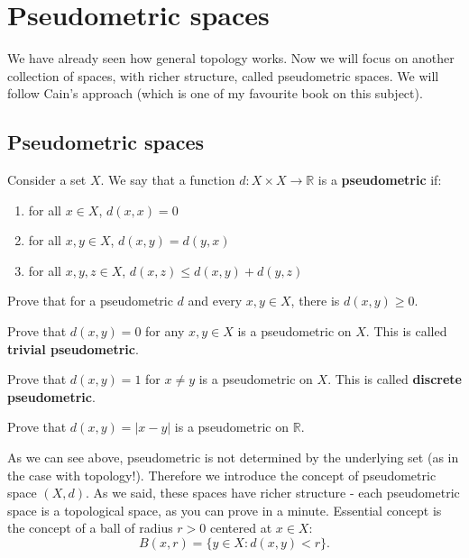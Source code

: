 \chapter{Pseudometric spaces}
\label{pseudometric_spaces}
We have already seen how general topology works. Now we will focus on another collection of spaces, with richer structure, called pseudometric spaces.
We will follow Cain's approach (which is one of my favourite book on this subject).

\section{Pseudometric spaces}
Consider a set $X$. We say that a function $d : X\times X\to \mathbb R$ is a \textbf{pseudometric} if:
\begin{enumerate}
	\item for all $x\in X$,  $d(x,x)=0$
	\item for all $x,y\in X$, $d(x,y)=d(y,x)$
	\item for all $x,y,z\in X$, $d(x,z)\le d(x,y)+d(y,z)$ 
\end{enumerate}

\begin{prob}
	Prove that for a pseudometric $d$ and every $x,y\in X$, there is $d(x,y)\ge 0$. 
\end{prob}

\begin{prob}
	Prove that $d(x,y)=0$ for any $x, y \in X$ is a pseudometric on $X$. This is called \textbf{trivial pseudometric}.
\end{prob}

\begin{prob}
	Prove that $d(x,y)=1$ for $x\neq y$ is a pseudometric on $X$. This is called \textbf{discrete pseudometric}.
\end{prob}

\begin{prob}
	Prove that $d(x,y)=|x-y|$ is a pseudometric on $\mathbb R$.
\end{prob}

As we can see above, pseudometric is not determined by the underlying set (as in the case with topology!). Therefore we introduce the concept of
pseudometric space $(X,d)$. As we said, these spaces have richer structure - each pseudometric space is a topological space, as you can prove in a minute.
Essential concept is the concept of a ball of radius $r>0$ centered at $x\in X$:
$$B(x, r) = \{y \in X : d(x,y) < r\}.$$

